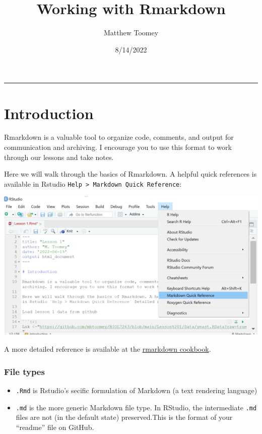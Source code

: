 \documentclass[
]{article}
\title{Working with Rmarkdown}
\author{Matthew Toomey}
\date{8/14/2022}
\providecommand{\tightlist}{%
  \setlength{\itemsep}{0pt}\setlength{\parskip}{0pt}}
\begin{document}
\maketitle

\begin{center}\rule{0.5\linewidth}{0.5pt}\end{center}

\hypertarget{introduction}{%
\section{Introduction}\label{introduction}}

Rmarkdown is a valuable tool to organize code, comments, and output for
communication and archiving. I encourage you to use this format to work
through our lessons and take notes.

Here we will walk through the basics of Rmarkdown. A helpful quick
references is available in Rstudio
\texttt{Help\ \textgreater{}\ Markdown\ Quick\ Reference}:

\includegraphics{Help.PNG}

A more detailed reference is available at the
\href{https://bookdown.org/yihui/rmarkdown-cookbook/}{rmarkdown
cookbook}.

\hypertarget{file-types}{%
\subsubsection{File types}\label{file-types}}

\begin{itemize}
\tightlist
\item
  \texttt{.Rmd} is Rstudio's secific formulation of Markdown (a text
  rendering language)
\item
  \texttt{.md} is the more generic Markdown file type. In RStudio, the
  intermediate \texttt{.md} files are not (in the default state)
  preserved.This is the format of your ``readme'' file on GitHub.
\end{itemize}
\end{document}
